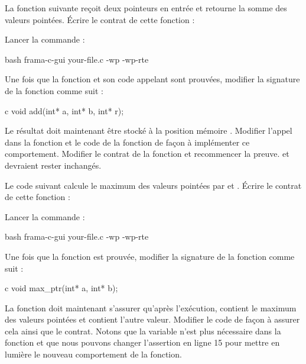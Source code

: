 La fonction suivante reçoit deux pointeurs en entrée et retourne la
somme des valeurs pointées. Écrire le contrat de cette fonction :




Lancer la commande :


\begin{CodeBlock}{bash}
frama-c-gui your-file.c -wp -wp-rte
\end{CodeBlock}


Une fois que la fonction et son code appelant sont prouvées, modifier
la signature de la fonction comme suit :


\begin{CodeBlock}{c}
void add(int* a, int* b, int* r);
\end{CodeBlock}


Le résultat doit maintenant être stocké à la position mémoire .
Modifier l'appel dans la fonction  et le code de la fonction de
façon à implémenter ce comportement. Modifier le contrat de la fonction
 et recommencer la preuve.  et 
devraient rester inchangés.




Le code suivant calcule le maximum des valeurs pointées par 
et . Écrire le contrat de cette fonction :




Lancer la commande :


\begin{CodeBlock}{bash}
frama-c-gui your-file.c -wp -wp-rte
\end{CodeBlock}


Une fois que la fonction est prouvée, modifier la signature de la
fonction comme suit :


\begin{CodeBlock}{c}
void max_ptr(int* a, int* b);
\end{CodeBlock}


La fonction doit maintenant s'assurer qu'après l'exécution, 
contient le maximum des valeurs pointées et  contient l'autre
valeur. Modifier le code de façon à assurer cela ainsi que le contrat.
Notons que la variable   n'est plus nécessaire dans la fonction
 et que nous pouvons changer l'assertion en ligne 15 pour
mettre en lumière le nouveau comportement de la fonction.


